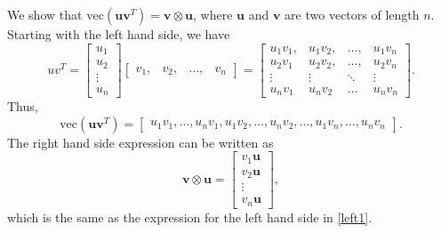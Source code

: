 We show that $\text{vec}(\mathbf{uv}^T) = \mathbf{v}\otimes\mathbf{ u}$, where $\mathbf u$ and $\mathbf v$ are two vectors of length $n$. Starting with the left hand side, we have
\begin{equation}
uv^T = 
\begin{bmatrix}
u_1 \\ u_2 \\ \vdots \\ u_n
\end{bmatrix}
\begin{bmatrix}
v_1, & v_2, & \dots, & v_n
\end{bmatrix}
 = \begin{bmatrix}
 u_1v_1, & u_1v_2, &\dots, & u_1v_n \\
 u_2v_1 & u_2v_2, &\dots, & u_2v_n\\
 \vdots & \vdots & \ddots & \vdots \\
 u_nv_1 & u_nv_2 & \dots & u_nv_n
 \end{bmatrix}.
\end{equation}
Thus, 
\begin{equation}\label{left1}
\text{vec}(\mathbf{uv}^T) = \begin{bmatrix}
u_1v_1,\dots,u_nv_1,u_1v_2,\dots,u_nv_2,\dots,u_1v_n,\dots,u_nv_n
\end{bmatrix}.
\end{equation}
The right hand side expression can be written as
\begin{equation}
\mathbf v\otimes \mathbf u = \begin{bmatrix}
v_1\mathbf u \\ v_2\mathbf u\\ \vdots\\ v_n\mathbf u
\end{bmatrix},
\end{equation}
which is the same as the expression for the left hand side in \eqref{left1}.

